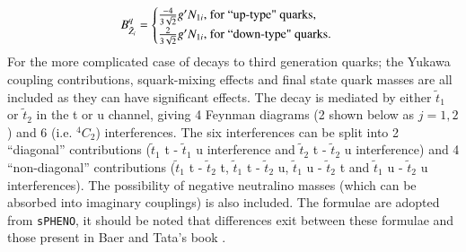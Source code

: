 \documentclass[final,3p,times,pdflatex]{elsarticle}
\begin{document}
\begin{equation}
B_{{\tilde{Z}_i}}^{q} = \begin{cases} 
						{-4 \over 3 \sqrt{2}} g'N_{1i}$, for ``up-type" quarks,$ \\
						{2 \over 3 \sqrt{2}} g' N_{1i}$, for ``down-type" quarks$.
                                              \end{cases}
\end{equation}
For the more complicated case of decays to third generation quarks; the Yukawa coupling contributions, squark-mixing effects and final state quark masses are all included as they can have significant effects. The decay is mediated by either $\tilde{t}_1$ or $\tilde{t}_2$ in the t or u channel, giving 4 Feynman diagrams (2 shown below as $j=1,2$) and 6 (i.e. $^4 C _2$) interferences. The six interferences can be split into 2 ``diagonal'' contributions ($\tilde{t}_1$ t - $\tilde{t}_1$ u interference and $\tilde{t}_2$ t - $\tilde{t}_2$ u interference) and 4 ``non-diagonal'' contributions ($\tilde{t}_1$ t - $\tilde{t}_2$ t, $\tilde{t}_1$ t - $\tilde{t}_2$ u, $\tilde{t}_1$ u - $\tilde{t}_2$ t and $\tilde{t}_1$ u - $\tilde{t}_2$ u interferences). The possibility of negative neutralino masses (which can be absorbed into imaginary couplings) is also included. The formulae are adopted from {\tt sPHENO}, it should be noted that differences exit between these formulae and those present in Baer and Tata's book \cite{TataBaer}.
\end{document}
